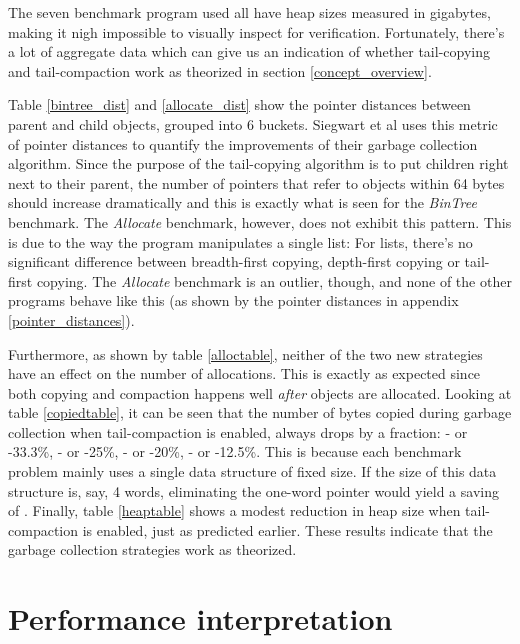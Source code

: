 \documentclass[a4paper,oneside]{memoir}
\begin{document}
The seven benchmark program used all have heap sizes measured in gigabytes,
making it nigh impossible to visually inspect for verification. Fortunately,
there's a lot of aggregate data which can give us an indication of whether
tail-copying and tail-compaction work as theorized in section \ref{concept_overview}.

Table \ref{bintree_dist} and \ref{allocate_dist} show the pointer distances
between parent and child objects, grouped into 6 buckets. Siegwart et al uses
this metric of pointer distances to quantify the improvements of their
garbage collection algorithm.\cite{Siegwart:2006} Since the purpose of the tail-copying algorithm
is to put children right next to their parent, the number of pointers that refer
to objects within 64 bytes should increase dramatically and this is exactly what
is seen for the \emph{BinTree} benchmark. The \emph{Allocate} benchmark, however,
does not exhibit this pattern. This is due to the way the program manipulates
a single list: For lists, there's no significant difference between breadth-first
copying, depth-first copying or tail-first copying. The \emph{Allocate} benchmark
is an outlier, though, and none of the other programs behave like this (as
shown by the pointer distances in appendix \ref{pointer_distances}).

Furthermore, as shown by table \ref{alloctable}, neither of the two new strategies
have an effect on the number of allocations. This is exactly as expected since
both copying and compaction happens well \emph{after} objects are allocated.
Looking at table \ref{copiedtable}, it can be seen that the number of bytes copied
during garbage collection when tail-compaction is enabled, always drops by a
fraction: - or -33.3\%, - or -25\%,
- or -20\%, - or -12.5\%. This is because each
benchmark problem mainly uses a single data structure of fixed size. If the size
of this data structure is, say, 4 words, eliminating the one-word pointer would
yield a saving of . Finally, table \ref{heaptable} shows a modest
reduction in heap size when tail-compaction is enabled, just as predicted earlier.
These results indicate that the garbage collection strategies work as theorized.

\section{Performance interpretation}


\end{document}

